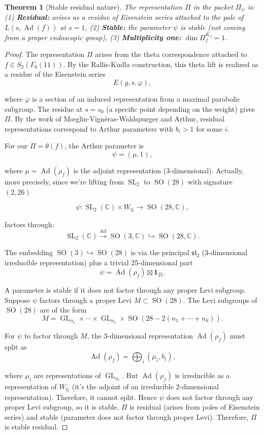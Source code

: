 \documentclass[12pt]{amsart}
\newtheorem{theorem}{Theorem}[section]
\theoremstyle{definition}
\DeclareMathOperator\SO{SO}
\DeclareMathOperator\SL{SL}
\DeclareMathOperator\GL{GL}
\DeclareMathOperator\Ad{Ad}
\newcommand{\Q}{\mathbb{Q}}
\newcommand{\C}{\mathbb{C}}
\begin{document}
\begin{theorem}[Stable residual nature]
The representation $\Pi$ in the packet $\Pi_{\psi}$ is: (1) \textbf{Residual:} arises as a residue of Eisenstein series attached to the pole of $L(s, \Ad(f))$ at $s = 1$, (2) \textbf{Stable:} the parameter $\psi$ is stable (not coming from a proper endoscopic group), (3) \textbf{Multiplicity one:} $\dim \Pi_f^{K_f} = 1$.
\end{theorem}
\begin{proof}

The representation $\Pi$ arises from the theta correspondence attached to $f \in S_2(\Gamma_0(11))$. By the Rallis-Kudla construction, this theta lift is realized as a residue of the Eisenstein series
$$E(g, s, \varphi),$$

where $\varphi$ is a section of an induced representation from a maximal parabolic subgroup. The residue at $s = s_0$ (a specific point depending on the weight) gives $\Pi$. By the work of Mœglin-Vignéras-Waldspurger and Arthur, residual representations correspond to Arthur parameters with $b_i > 1$ for some $i$.

For our $\Pi = \theta(f)$, the Arthur parameter is
$$\psi = (\mu, 1),$$

where $\mu = \Ad(\rho_f)$ is the adjoint representation (3-dimensional). Actually, more precisely, since we're lifting from $\SL_2$ to $\SO(28)$ with signature $(2,26)$

$$\psi: \SL_2(\C) \times W_{\Q} \to \SO(28, \C),$$

factors through:
$$\SL_2(\C) \xrightarrow{\Ad} \SO(3, \C) \hookrightarrow \SO(28, \C).$$

The embedding $\SO(3) \hookrightarrow \SO(28)$ is via the principal $\mathfrak{sl}_2$ (3-dimensional irreducible representation) plus a trivial 25-dimensional part
$$\psi = \Ad(\rho_f) \boxtimes \mathbf{1}_{25}.$$

A parameter is stable if it does not factor through any proper Levi subgroup. Suppose $\psi$ factors through a proper Levi $M \subset \SO(28)$. The Levi subgroups of $\SO(28)$ are of the form
$$M = \GL_{n_1} \times \cdots \times \GL_{n_k} \times \SO(28 - 2(n_1 + \cdots + n_k)).$$

For $\psi$ to factor through $M$, the 3-dimensional representation $\Ad(\rho_f)$ must split as
$$\Ad(\rho_f) = \bigoplus_i (\mu_i, b_i),$$

where $\mu_i$ are representations of $\GL_{n_i}$. But $\Ad(\rho_f)$ is irreducible as a representation of $W_{\Q}$ (it's the adjoint of an irreducible 2-dimensional representation). Therefore, it cannot split. Hence $\psi$ does not factor through any proper Levi subgroup, so it is stable. $\Pi$ is residual (arises from poles of Eisenstein series) and stable (parameter does not factor through proper Levi). Therefore, $\Pi$ is stable residual.
\end{proof}
\end{document}
